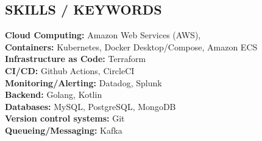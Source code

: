 \documentclass[margin,line]{resume}
\begin{document}
\begin{resume}
\sectionline
    \section{\mysidestyle \textbf{\large{S}\small{KILLS} / \large{K}\small{EYWORDS}}}

    \textbf{Cloud Computing:} Amazon Web Services (AWS), \\
    \textbf{Containers:} Kubernetes, Docker Desktop/Compose, Amazon ECS\\
    \textbf{Infrastructure as Code:} Terraform\\
    \textbf{CI/CD:} Github Actions, CircleCI\\
    \textbf{Monitoring/Alerting:} Datadog, Splunk\\
    \textbf{Backend:} Golang, Kotlin\\
    \textbf{Databases:} MySQL, PostgreSQL, MongoDB\\
    \textbf{Version control systems:} Git \\
    \textbf{Queueing/Messaging:} Kafka


\end{resume}
\end{document}
